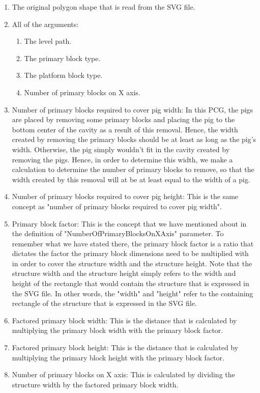 \documentclass[12pt]{dalthesis}
\begin{document}
\begin{enumerate}
  \begin{enumerate}
    \item The original polygon shape that is read from the SVG file.
    \item All of the arguments:
    \begin{enumerate}
      \item The level path.
      \item The primary block type.
      \item The platform block type.
      \item Number of primary blocks on X axis.
    \end{enumerate}
    \item Number of primary blocks required to cover pig width: In this PCG, the pigs are placed by removing some primary blocks and placing the pig to the bottom center of the cavity as a result of this removal. Hence, the width created by removing the primary blocks should be at least as long as the pig's width. Otherwise, the pig simply wouldn't fit in the cavity created by removing the pigs. Hence, in order to determine this width, we make a calculation to determine the number of primary blocks to remove, so that the width created by this removal will at be at least equal to the width of a pig.
    \item Number of primary blocks required to cover pig height: This is the same concept as "number of primary blocks required to cover pig width".
    \item Primary block factor: This is the concept that we have mentioned about in the definition of "NumberOfPrimaryBlocksOnXAxis" parameter. To remember what we have stated there, the primary block factor is a ratio that dictates the factor the primary block dimensions need to be multiplied with in order to cover the structure width and the structure height. Note that the structure width and the structure height simply refers to the width and height of the rectangle that would contain the structure that is expressed in the SVG file. In other words, the "width" and "height" refer to the containing rectangle of the structure that is expressed in the SVG file.
    \item Factored primary block width: This is the distance that is calculated by multiplying the primary block width with the primary block factor.
    \item Factored primary block height: This is the distance that is calculated by multiplying the primary block height with the primary block factor.
    \item Number of primary blocks on X axis: This is calculated by dividing the structure width by the factored primary block width.

\end{enumerate}
\end{enumerate}
\end{document}
